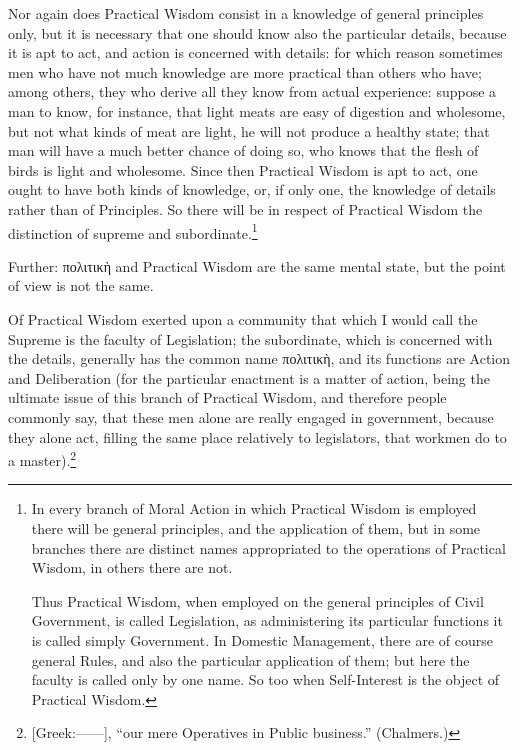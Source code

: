 Nor again does Practical Wisdom consist in a knowledge of general principles
only, but it is necessary that one should know also the particular details,
because it is apt to act, and action is concerned with details: for which
reason sometimes men who have not much knowledge are more practical than others
who have; among others, they who derive all they know from actual experience:
suppose a man to know, for instance, that light meats are easy of digestion and
wholesome, but not what kinds of meat are light, he will not produce a healthy
state; that man will have a much better chance of doing so, who knows that the
flesh of birds is light and wholesome. Since then Practical Wisdom is apt to
act, one ought to have both kinds of knowledge, or, if only one, the knowledge
of details rather than of Principles. So there will be in respect of Practical
Wisdom the distinction of supreme and
subordinate.\footnote{In every branch of Moral Action in which Practical Wisdom is employed there
will be general principles, and the application of them, but in some branches
there are distinct names appropriated to the operations of Practical Wisdom, in
others there are not.

Thus Practical Wisdom, when employed on the general principles of Civil
Government, is called Legislation, as administering its particular functions it
is called simply Government. In Domestic Management, there are of course
general Rules, and also the particular application of them; but here the
faculty is called only by one name. So too when Self-Interest is the object of
Practical Wisdom.}

Further: πολιτικὴ and Practical Wisdom
are the same mental state, but the point of view is not the same.

Of Practical Wisdom exerted upon a community that which I would call the
Supreme is the faculty of Legislation; the subordinate, which is concerned with
the details, generally has the common name
πολιτικὴ, and its functions are Action
and Deliberation (for the particular enactment is a matter of action, being the
ultimate issue of this branch of Practical Wisdom, and therefore people
commonly say, that these men alone are really engaged in government, because
they alone act, filling the same place relatively to legislators, that workmen
do to a master).\footnote{[Greek:——], “our mere Operatives in Public business.”
(Chalmers.)}


